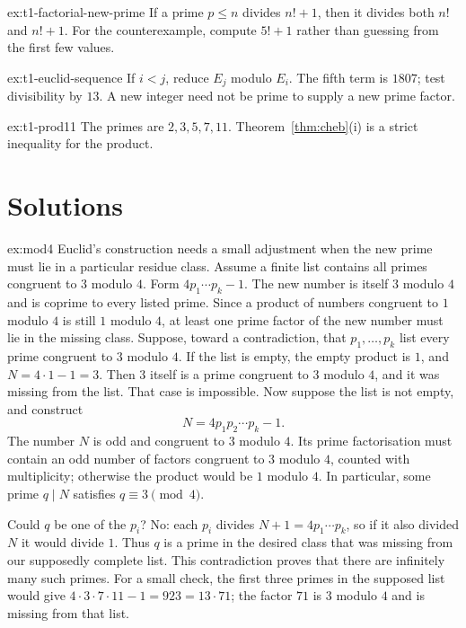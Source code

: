 \begin{hint}{ex:t1-factorial-new-prime}
If a prime $p\le n$ divides $n!+1$, then it divides both $n!$ and $n!+1$. For the counterexample, compute $5!+1$ rather than guessing from the first few values.
\end{hint}
\begin{hint}{ex:t1-euclid-sequence}
If $i<j$, reduce $E_j$ modulo $E_i$. The fifth term is $1807$; test divisibility by $13$. A new integer need not be prime to supply a new prime factor.
\end{hint}

\begin{hint}{ex:t1-prod11}
The primes are $2,3,5,7,11$. Theorem~\ref{thm:cheb}(i) is a strict inequality for the product.
\end{hint}

\section{Solutions}

\begin{solution}{ex:mod4}
\idea Euclid's construction needs a small adjustment when the new prime must lie in a particular residue class. Assume a finite list contains all primes congruent to $3$ modulo $4$. Form $4p_1\cdots p_k-1$. The new number is itself $3$ modulo $4$ and is coprime to every listed prime. Since a product of numbers congruent to $1$ modulo $4$ is still $1$ modulo $4$, at least one prime factor of the new number must lie in the missing class.
\writeup Suppose, toward a contradiction, that $p_1,\ldots,p_k$ list every prime congruent to $3$ modulo $4$. If the list is empty, the empty product is $1$, and $N=4\cdot1-1=3$. Then $3$ itself is a prime congruent to $3$ modulo $4$, and it was missing from the list. That case is impossible. Now suppose the list is not empty, and construct
\[
N=4p_1p_2\cdots p_k-1.
\]
The number $N$ is odd and congruent to $3$ modulo $4$. Its prime factorisation must contain an odd number of factors congruent to $3$ modulo $4$, counted with multiplicity; otherwise the product would be $1$ modulo $4$. In particular, some prime $q\mid N$ satisfies $q\equiv3\pmod4$.

Could $q$ be one of the $p_i$? No: each $p_i$ divides $N+1=4p_1\cdots p_k$, so if it also divided $N$ it would divide $1$. Thus $q$ is a prime in the desired class that was missing from our supposedly complete list. This contradiction proves that there are infinitely many such primes. For a small check, the first three primes in the supposed list would give $4\cdot3\cdot7\cdot11-1=923=13\cdot71$; the factor $71$ is $3$ modulo $4$ and is missing from that list.
\end{solution}

